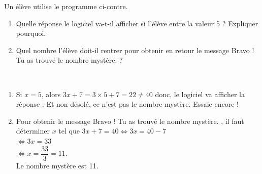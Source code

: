 \begin{exercice}[CRPE 2017 G3]
   \begin{minipage}{8cm}
   Un élève utilise le programme ci-contre.
   \begin{enumerate}
      \item Quelle réponse le logiciel va-t-il afficher si l’élève entre la valeur 5 ? Expliquer pourquoi.
      \item Quel nombre l’élève doit-il rentrer pour obtenir en retour le message \og Bravo ! Tu as trouvé le nombre mystère. \fg ?
   \end{enumerate}
   \end{minipage}
   \hfill
   \begin{minipage}{8cm}
      \vspace*{-12mm}
      \begin{scratch}    
            {}
            {}
      \end{scratch}
   \end{minipage}
\end{exercice}

\begin{corrige}
\ \\ [-5mm]
   \begin{enumerate}
      \item Si $x =5$, alors $3x+7 =3\times5+7 =22\neq40$ donc, le logiciel va afficher la réponse : {\blue Et non désolé, ce n'est pas le nombre mystère. Essaie encore !}
      \item Pour obtenir le message \og Bravo ! Tu as trouvé le nombre mystère. \fg, il faut déterminer $x$ tel que $3x+7 =40 \iff 3x =40-7$ \\
         \hspace*{17mm} $\iff 3x =33$ \\ [1mm]
         \hspace*{17mm} $\iff x =\dfrac{33}{3} =11$. \\ [1mm]
         {\blue Le nombre mystère est 11}.
   \end{enumerate}
\end{corrige}

